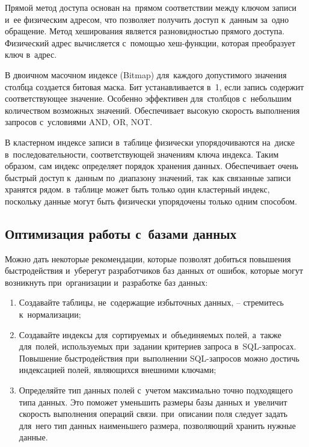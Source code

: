 \documentclass{ou}
\begin{document}
Прямой метод доступа основан на~прямом соответствии между ключом записи и~ее физическим адресом, что позволяет получить доступ к~данным за~одно обращение. Метод хеширования является разновидностью прямого доступа. Физический адрес вычисляется с~помощью хеш-функции, которая преобразует ключ в~адрес.

В двоичном масочном индексе (Bitmap) для~каждого допустимого значения столбца создается битовая маска. Бит устанавливается в~1, если запись содержит соответствующее значение. Особенно эффективен для~столбцов с~небольшим количеством возможных значений. Обеспечивает высокую скорость выполнения запросов с~условиями AND, OR, NOT.

В кластерном индексе записи в~таблице физически упорядочиваются на~диске в~последовательности, соответствующей значениям ключа индекса. Таким образом, сам индекс определяет порядок хранения данных. Обеспечивает очень быстрый доступ к~данным по~диапазону значений, так~как связанные записи хранятся рядом. в~таблице может быть только один кластерный индекс, поскольку данные могут быть физически упорядочены только одним способом.

\subsection{Оптимизация работы с~базами данных}
Можно дать некоторые рекомендации, которые позволят добиться повышения быстродействия и~уберегут разработчиков баз данных от ошибок, которые могут возникнуть при~организации и~разработке баз данных:
\begin{enumerate}[itemindent=4em, nosep, label=\arabic*)]
\item Создавайте таблицы, не~содержащие избыточных данных, -- стремитесь к~нормализации;
\item Создавайте индексы для~сортируемых и~объединяемых полей, а~также для~полей, используемых при~задании критериев запроса в~SQL-запросах. Повышение быстродействия при~выполнении SQL-запросов можно достичь индексацией полей, являющихся внешними ключами;
\item Определяйте тип данных полей с~учетом максимально точно подходящего типа данных. Это поможет уменьшить размеры базы данных и~увеличит скорость выполнения операций связи. при~описании поля следует задать для~него тип данных наименьшего размера, позволяющий хранить нужные данные.
\end{enumerate}
\end{document}
